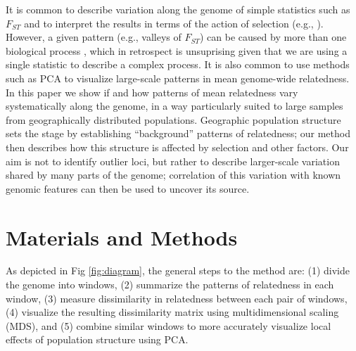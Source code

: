 \documentclass[11pt, oneside]{article}   	%
\newcommand\citet{\cite}
\newcommand\citep{\cite}
\newcommand{\Figure}{Fig }
\newcommand{\Figure}{{Figure }}
\begin{document}
It is common to describe variation along the genome of simple statistics such as $F_{ST}$
and to interpret the results in terms of the action of selection 
(e.g., \citet{turner2005genomic,ellegren2012genomic}).
However, a given pattern (e.g., valleys of $F_{ST}$)
can be caused by more than one biological process \citep{cruickshank2014reanalysis,burri2015linked},
which in retrospect is unsuprising given that we are using a single statistic
to describe a complex process.
It is also common to use methods such as PCA to visualize large-scale patterns in 
mean genome-wide relatedness.
In this paper we show if and how patterns of mean relatedness vary systematically along the genome, 
in a way particularly suited to large samples from geographically distributed populations.
Geographic population structure sets the stage by establishing ``background'' patterns of relatedness;
our method then describes how this structure is affected by selection and other factors.
Our aim is not to identify outlier loci,
but rather to describe larger-scale variation shared by many parts of the genome;
correlation of this variation with known genomic features
can then be used to uncover its source. 



\section{Materials and Methods}


As depicted in \Figure \ref{fig:diagram}, the general steps to the method are:
(1) divide the genome into windows,
(2) summarize the patterns of relatedness in each window,
(3) measure dissimilarity in relatedness between each pair of windows,
(4) visualize the resulting dissimilarity matrix using multidimensional scaling (MDS),
and (5) combine similar windows to more accurately visualize local effects of population structure using PCA.
\end{document}
